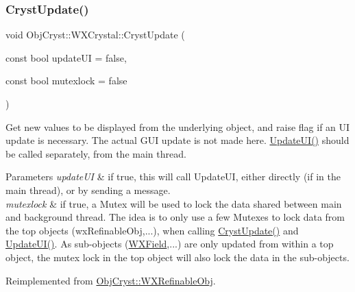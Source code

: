 \subsubsection{\texorpdfstring{CrystUpdate()}{CrystUpdate()}}
{\footnotesize\ttfamily void Obj\+Cryst\+::\+W\+X\+Crystal\+::\+Cryst\+Update (\begin{DoxyParamCaption}\item[{const bool}]{update\+UI = {\ttfamily false},  }\item[{const bool}]{mutexlock = {\ttfamily false} }\end{DoxyParamCaption})\hspace{0.3cm}{\ttfamily [virtual]}}

Get new values to be displayed from the underlying object, and raise flag if an UI update is necessary. The actual G\+UI update is not made here. \mbox{\hyperlink{class_obj_cryst_1_1_w_x_crystal_a62946717943682dc2ac07ea4584030f4}{Update\+U\+I()}} should be called separately, from the main thread.


\begin{DoxyParams}{Parameters}
{\em update\+UI} & if true, this will call Update\+UI, either directly (if in the main thread), or by sending a message. \\
\hline
{\em mutexlock} & if true, a Mutex will be used to lock the data shared between main and background thread. The idea is to only use a few Mutexes to lock data from the top objects (wx\+Refinable\+Obj,...), when calling \mbox{\hyperlink{class_obj_cryst_1_1_w_x_crystal_a4b48719679bb8be44eb77a45ac28f4fb}{Cryst\+Update()}} and \mbox{\hyperlink{class_obj_cryst_1_1_w_x_crystal_a62946717943682dc2ac07ea4584030f4}{Update\+U\+I()}}. As sub-\/objects (\mbox{\hyperlink{class_obj_cryst_1_1_w_x_field}{W\+X\+Field}},...) are only updated from within a top object, the mutex lock in the top object will also lock the data in the sub-\/objects. \\
\hline
\end{DoxyParams}


Reimplemented from \mbox{\hyperlink{class_obj_cryst_1_1_w_x_refinable_obj_a8249d288e62ad1ebffeea91f77ae37a3}{Obj\+Cryst\+::\+W\+X\+Refinable\+Obj}}.

